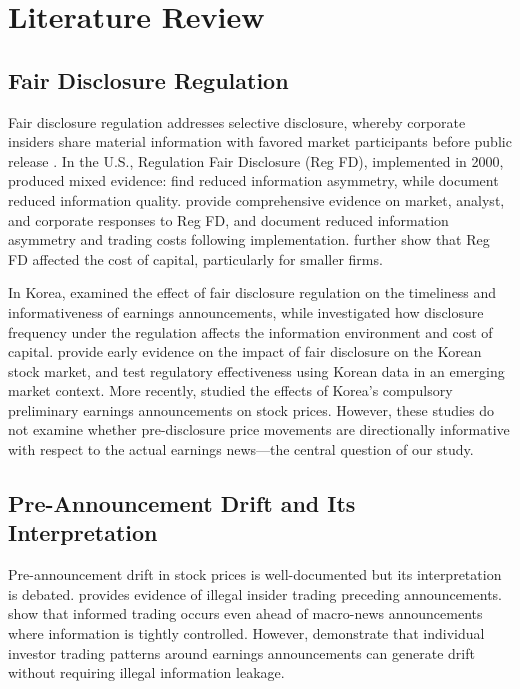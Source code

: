 \documentclass[review,authoryear]{elsarticle}
\begin{document}
\section{Literature Review}
\label{sec:literature}

\subsection{Fair Disclosure Regulation}

Fair disclosure regulation addresses selective disclosure, whereby corporate insiders share material information with favored market participants before public release \citep{heflin2003regulation}. In the U.S., Regulation Fair Disclosure (Reg FD), implemented in 2000, produced mixed evidence: \citet{ahmed2003impact} find reduced information asymmetry, while \citet{heflin2003regulation} document reduced information quality. \citet{bailey2003regulation} provide comprehensive evidence on market, analyst, and corporate responses to Reg FD, and \citet{eleswarapu2004impact} document reduced information asymmetry and trading costs following implementation. \citet{gomes2007sec} further show that Reg FD affected the cost of capital, particularly for smaller firms.

In Korea, \citet{yun2012fair} examined the effect of fair disclosure regulation on the timeliness and informativeness of earnings announcements, while \citet{oh2017disclosure} investigated how disclosure frequency under the regulation affects the information environment and cost of capital. \citet{yoon2011impact} provide early evidence on the impact of fair disclosure on the Korean stock market, and \citet{lee2012testing} test regulatory effectiveness using Korean data in an emerging market context. More recently, \citet{shin2023korea} studied the effects of Korea's compulsory preliminary earnings announcements on stock prices. However, these studies do not examine whether pre-disclosure price movements are directionally informative with respect to the actual earnings news---the central question of our study.

\subsection{Pre-Announcement Drift and Its Interpretation}

Pre-announcement drift in stock prices is well-documented but its interpretation is debated. \citet{meulbroek1992comparison} provides evidence of illegal insider trading preceding announcements. \citet{bernile2016can} show that informed trading occurs even ahead of macro-news announcements where information is tightly controlled. However, \citet{kaniel2012individual} demonstrate that individual investor trading patterns around earnings announcements can generate drift without requiring illegal information leakage.
\end{document}
